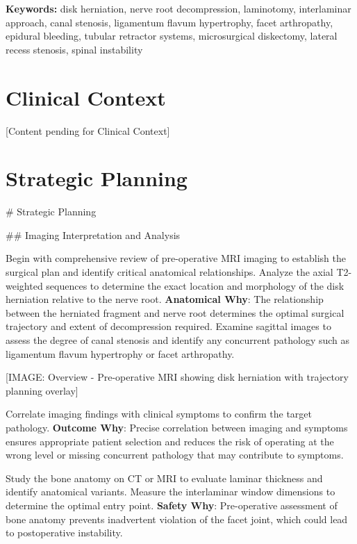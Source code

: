 \documentclass[12pt,a4paper]{article}
\begin{document}

\noindent\textbf{Keywords:} disk herniation, nerve root decompression, laminotomy, interlaminar approach, canal stenosis, ligamentum flavum hypertrophy, facet arthropathy, epidural bleeding, tubular retractor systems, microsurgical diskectomy, lateral recess stenosis, spinal instability
\vspace{1em}




\section{Clinical Context}




[Content pending for Clinical Context]







\section{Strategic Planning}




\# Strategic Planning

\#\# Imaging Interpretation and Analysis

Begin with comprehensive review of pre-operative MRI imaging to establish the surgical plan and identify critical anatomical relationships. Analyze the axial T2-weighted sequences to determine the exact location and morphology of the disk herniation relative to the nerve root. \textbf{Anatomical Why}: The relationship between the herniated fragment and nerve root determines the optimal surgical trajectory and extent of decompression required. Examine sagittal images to assess the degree of canal stenosis and identify any concurrent pathology such as ligamentum flavum hypertrophy or facet arthropathy.

[IMAGE: Overview - Pre-operative MRI showing disk herniation with trajectory planning overlay]

Correlate imaging findings with clinical symptoms to confirm the target pathology. \textbf{Outcome Why}: Precise correlation between imaging and symptoms ensures appropriate patient selection and reduces the risk of operating at the wrong level or missing concurrent pathology that may contribute to symptoms.

Study the bone anatomy on CT or MRI to evaluate laminar thickness and identify anatomical variants. Measure the interlaminar window dimensions to determine the optimal entry point. \textbf{Safety Why}: Pre-operative assessment of bone anatomy prevents inadvertent violation of the facet joint, which could lead to postoperative instability.
\end{document}
